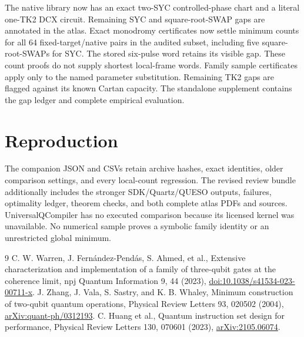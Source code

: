 \documentclass[11pt]{article}
\begin{document}
The native library now has an exact two-SYC controlled-phase chart and a
literal one-TK2 DCX circuit. Remaining SYC and square-root-SWAP gaps are
annotated in the atlas. Exact monodromy certificates now settle minimum
counts for all 64 fixed-target/native pairs in the audited subset, including
five square-root-SWAPs for SYC. The stored six-pulse word retains its visible
gap. These count proofs do not supply shortest local-frame words. Family
sample certificates apply only to the named parameter substitution. Remaining TK2 gaps are
flagged against its known Cartan capacity. The standalone supplement
contains the gap ledger and complete empirical evaluation.
\section{Reproduction}
The companion JSON and CSVs retain archive hashes, exact identities, older
comparison settings, and every local-count regression. The revised review
bundle additionally includes the stronger SDK/Quartz/QUESO outputs, failures,
optimality ledger, theorem checks, and both complete atlas PDFs and sources.
UniversalQCompiler has no executed comparison because its licensed kernel
was unavailable. No numerical sample proves a symbolic family identity or
an unrestricted global minimum.
\begin{thebibliography}{9}
 C. W. Warren, J. Fern\'andez-Pend\'as, S. Ahmed, et al.,
Extensive characterization and implementation of a family of three-qubit
gates at the coherence limit, npj Quantum Information 9, 44 (2023),
\href{https://doi.org/10.1038/s41534-023-00711-x}{doi:10.1038/s41534-023-00711-x}.
 J. Zhang, J. Vala, S. Sastry, and K. B. Whaley, Minimum
construction of two-qubit quantum operations, Physical Review Letters 93,
020502 (2004), \href{https://arxiv.org/abs/quant-ph/0312193}{arXiv:quant-ph/0312193}.
 C. Huang et al., Quantum instruction set design for performance,
Physical Review Letters 130, 070601 (2023),
\href{https://arxiv.org/abs/2105.06074}{arXiv:2105.06074}.
\end{thebibliography}
\end{document}
